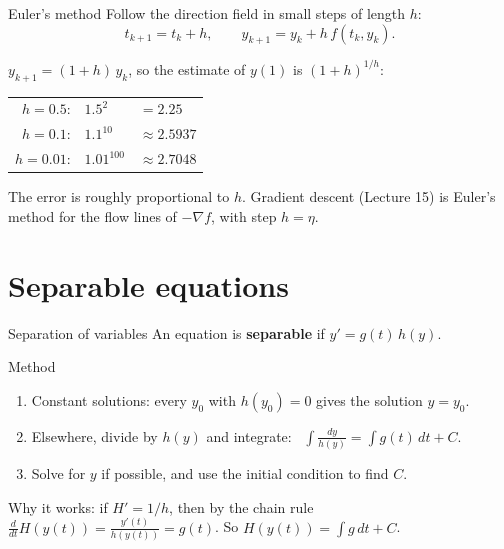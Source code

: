 \documentclass[10pt]{wosm-slides}
\begin{document}
\begin{frame}{Euler's method}
  Follow the direction field in small steps of length $h$:
  \[ t_{k+1} = t_k + h, \qquad y_{k+1} = y_k + h\, f(t_k, y_k) . \]
  \pause
  \begin{example}[$y' = y$, $y(0) = 1$; the exact value $y(1) = e \approx 2.71828$]
    $y_{k+1} = (1 + h)\, y_k$, so the estimate of $y(1)$ is $(1 + h)^{1/h}$:
    \begin{center}
      \begin{tabular}{rll}
        $h = 0.5$: & $1.5^2$ & $= 2.25$ \\
        $h = 0.1$: & $1.1^{10}$ & $\approx 2.5937$ \\
        $h = 0.01$: & $1.01^{100}$ & $\approx 2.7048$
      \end{tabular}
    \end{center}
  \end{example}
  \pause
  {\small The error is roughly proportional to $h$. Gradient descent (Lecture 15) is Euler's method for
  the flow lines of $-\nabla f$, with step $h = \eta$.\par}
\end{frame}

\section{Separable equations}

\begin{frame}{Separation of variables}
  An equation is \textbf{separable} if $y' = g(t)\, h(y)$.
  \pause
  \begin{block}{Method}
    \begin{enumerate}
      \item Constant solutions: every $y_0$ with $h(y_0) = 0$ gives the solution $y = y_0$.
      \item Elsewhere, divide by $h(y)$ and integrate: \
        $\displaystyle \int \frac{dy}{h(y)} = \int g(t)\, dt + C$.
      \item Solve for $y$ if possible, and use the initial condition to find $C$.
    \end{enumerate}
  \end{block}
  \pause
  {\small Why it works: if $H' = 1/h$, then by the chain rule
  $\frac{d}{dt} H(y(t)) = \frac{y'(t)}{h(y(t))} = g(t)$. So $H(y(t)) = \int g\, dt + C$.\par}
\end{frame}
\end{document}
